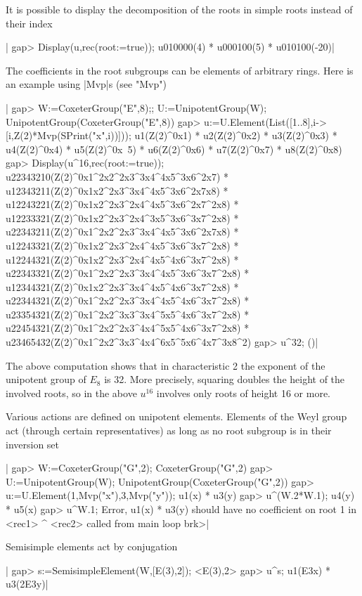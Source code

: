 It is possible to display the decomposition of the roots in simple roots
instead of their index\:

|    gap> Display(u,rec(root:=true));
    u010000(4) * u000100(5) * u010100(-20)|

The coefficients in the root subgroups can be elements of arbitrary rings.
Here is an example using |Mvp|s (see "Mvp")\:

|    gap>  W:=CoxeterGroup("E",8);; U:=UnipotentGroup(W);
    UnipotentGroup(CoxeterGroup("E",8))
    gap> u:=U.Element(List([1..8],i->[i,Z(2)*Mvp(SPrint("x",i))]));
    u1(Z(2)^0x1) * u2(Z(2)^0x2) * u3(Z(2)^0x3) * u4(Z(2)^0x4) * u5(Z(2)^0x\
    5) * u6(Z(2)^0x6) * u7(Z(2)^0x7) * u8(Z(2)^0x8)
    gap> Display(u^16,rec(root:=true));
    u22343210(Z(2)^0x1^2x2^2x3^3x4^4x5^3x6^2x7) * 
    u12343211(Z(2)^0x1x2^2x3^3x4^4x5^3x6^2x7x8) * 
    u12243221(Z(2)^0x1x2^2x3^2x4^4x5^3x6^2x7^2x8) * 
    u12233321(Z(2)^0x1x2^2x3^2x4^3x5^3x6^3x7^2x8) * 
    u22343211(Z(2)^0x1^2x2^2x3^3x4^4x5^3x6^2x7x8) * 
    u12243321(Z(2)^0x1x2^2x3^2x4^4x5^3x6^3x7^2x8) * 
    u12244321(Z(2)^0x1x2^2x3^2x4^4x5^4x6^3x7^2x8) * 
    u22343321(Z(2)^0x1^2x2^2x3^3x4^4x5^3x6^3x7^2x8) * 
    u12344321(Z(2)^0x1x2^2x3^3x4^4x5^4x6^3x7^2x8) * 
    u22344321(Z(2)^0x1^2x2^2x3^3x4^4x5^4x6^3x7^2x8) * 
    u23354321(Z(2)^0x1^2x2^3x3^3x4^5x5^4x6^3x7^2x8) * 
    u22454321(Z(2)^0x1^2x2^2x3^4x4^5x5^4x6^3x7^2x8) * 
    u23465432(Z(2)^0x1^2x2^3x3^4x4^6x5^5x6^4x7^3x8^2)
    gap> u^32;
    ()|

The  above computation shows  that in characteristic  2 the exponent of the
unipotent group of $E_8$ is 32. More precisely, squaring doubles the height
of  the involved  roots, so  in the  above $u^{16}$  involves only roots of
height 16 or more.

Various  actions are  defined on  unipotent elements.  Elements of the Weyl
group  act (through certain representatives) as long as no root subgroup is
in their inversion set\:

|    gap> W:=CoxeterGroup("G",2);
    CoxeterGroup("G",2)
    gap> U:=UnipotentGroup(W);
    UnipotentGroup(CoxeterGroup("G",2))
    gap> u:=U.Element(1,Mvp("x"),3,Mvp("y"));
    u1(x) * u3(y)
    gap> u^(W.2*W.1);
    u4(y) * u5(x)
    gap> u^W.1;      
    Error, u1(x) * u3(y) should have no coefficient on root 1
     in
    <rec1> ^ <rec2> called from
    main loop
    brk>|

Semisimple elements act by conjugation\:

|    gap> s:=SemisimpleElement(W,[E(3),2]);
    <E(3),2>
    gap> u^s;
    u1(E3x) * u3(2E3y)|

